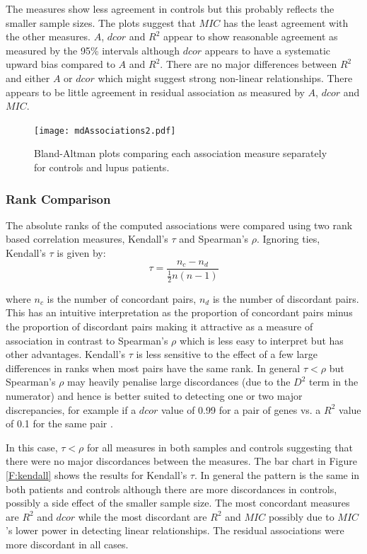 \documentclass[a4paper, 12pt]{report}
\begin{document}
The measures show less agreement in controls but this probably reflects the smaller sample sizes. The plots suggest that $MIC$ has the least agreement with the other measures. $A$, $dcor$ and $R^2$ appear to show reasonable agreement  as measured by the 95\% intervals although $dcor$ appears to have a systematic upward bias compared to $A$ and $R^2$. There are  no major differences between $R^2$ and either $A$ or $dcor$ which might suggest strong non-linear relationships. There appears to be little agreement in residual association as measured by $A$, $dcor$ and $MIC$.

\begin{figure}[H]
\begin{center}
\texttt{[image: mdAssociations2.pdf]}
\caption{Bland-Altman plots comparing each association measure separately for controls and lupus patients.} 
\label{F:baTwoway}
\end{center}
\end{figure}


\subsubsection{Rank Comparison}
The absolute ranks of the computed associations were compared using two rank based correlation measures, Kendall's $\tau$ and Spearman's $\rho$. Ignoring ties, Kendall's $\tau$ is given by:
\[
\tau = \frac{n_c - n_d}{\frac{1}{2}n(n-1)}
\]

where $n_c$ is the number of concordant pairs, $n_d$ is the number of discordant pairs. This has an intuitive interpretation as the proportion of concordant pairs minus the proportion of discordant pairs making it attractive as a measure of association in contrast to Spearman's $\rho$ which is less easy to interpret but has other advantages. Kendall's $\tau$ is less sensitive to the effect of a few large differences in ranks when most pairs have the same rank. In general $\tau < \rho$ but Spearman's $\rho$ may heavily penalise large discordances (due to the $D^2$ term in the numerator) and hence is better suited to detecting one or two major discrepancies, for example if a $dcor$ value of 0.99 for a pair of genes vs. a $R^2$ value of 0.1 for the same pair \cite{Kendall}. 

In this case, $\tau < \rho$ for all measures in both samples and controls suggesting that there were no major discordances between the measures. The bar chart in Figure \ref{F:kendall} shows the results  for Kendall's $\tau$. In general the pattern is the same in both patients and controls although there are more discordances in controls, possibly a side effect of the smaller sample size. The most concordant measures are $R^2$ and $dcor$ while the most discordant are $R^2$ and $MIC$ possibly due to $MIC$'s lower power in detecting linear relationships. The residual associations were more discordant in all cases.
\end{document}
